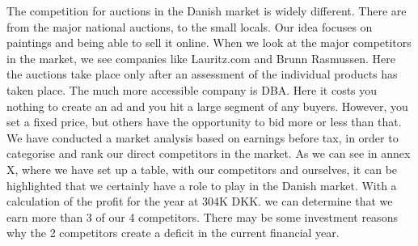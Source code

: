 The competition for auctions in the Danish market is widely different. There are from the major national auctions, to the small locals. Our idea focuses on paintings and being able to sell it online.
When we look at the major competitors in the market, we see companies like Lauritz.com and Brunn Rasmussen. Here the auctions take place only after an assessment of the individual products has taken place. The much more accessible company is DBA. Here it costs you nothing to create an ad and you hit a large segment of any buyers. However, you set a fixed price, but others have the opportunity to bid more or less than that.
We have conducted a market analysis based on earnings before tax, in order to categorise and rank our direct competitors in the market.
As we can see in annex X, where we have set up a table, with our competitors and ourselves, it can be highlighted that we certainly have a role to play in the Danish market.
With a calculation of the profit for the year at 304K DKK. we can determine that we earn more than 3 of our 4 competitors. There may be some investment reasons why the 2 competitors create a deficit in the current financial year.
